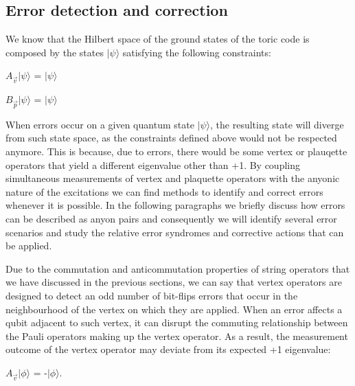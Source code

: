 \documentclass{Configuration_Files/PoliMi3i_thesis}
\begin{document}
\subsection{Error detection and correction}

We know that the Hilbert space of the ground states of the toric code is composed by the states $|\psi\rangle $ satisfying the following constraints: 

\begin{center}
	$A_{\vec{v}}|\psi\rangle $ = $|\psi\rangle $ 
\end{center}
\begin{center}
	$B_{\vec{p}}|\psi\rangle $ = $|\psi\rangle $ 
\end{center}

When errors occur on a given quantum state $|\psi\rangle$, the resulting state will diverge from such state space, as the constraints defined above would not be respected anymore. This is because, due to errors, there would be some vertex or plauqette operators that yield a different eigenvalue other than +1. \newline
By coupling simultaneous measurements of vertex and plaquette operators with the anyonic nature of the excitations we can find methods to identify and correct errors whenever it is possible. In the following paragraphs we briefly discuss how errors can be described as anyon pairs and consequently we will identify several error scenarios and study the relative error syndromes and corrective actions that can be applied. \newline

Due to the commutation and anticommutation properties of string operators that we have discussed in the previous sections, we can say that vertex operators are designed to detect an odd number of bit-flips errors that occur in the neighbourhood of the vertex on which they are applied. When an error affects a qubit adjacent to such vertex, it can disrupt the commuting relationship between the Pauli operators making up the vertex operator. As a result, the measurement outcome of the vertex operator may deviate from its expected +1 eigenvalue: 

\begin{center}
	$A_{\vec{v}}|\phi\rangle $ = -$|\phi\rangle $.
\end{center}
\end{document}
